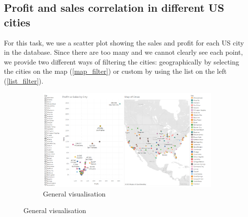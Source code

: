 \documentclass[openany]{article}
\begin{document}
\clearpage

\subsection {Profit and sales correlation in different US cities}

For this task, we use a scatter plot showing the sales and profit for each US city in the database. Since there are too many and we cannot clearly see each point, we provide two different ways of filtering the cities: geographically by selecting the cities on the map (\ref {map_filter}) or custom by using the list on the left (\ref {list_filter}).

\begin{figure}[h]
	\centering
	\begin{subfigure}{\textwidth}
		\centering
		\includegraphics[width=\linewidth]{Tableau/c_1}
		\caption{General visualisation}
	\end{subfigure}
\end{figure}
\end{document}
